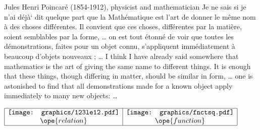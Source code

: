 \qboxnqt
  {
    Jules Henri Poincar\'e (1854-1912), physicist and mathematician
    \footnotemark
  }
  {Je ne sais si je n'ai d\'ej\`a` dit quelque part que la Math\'ematique est 
  l'art de donner le m\^eme nom \`a des choses diff\'erentes. 
  Il convient que ces choses, diff\'erentes par la mati\`ere, 
  soient semblables par la forme, 
  \ldots
  on est tout \'etonn\'e 
  de voir que toutes les d\'emonstrations, faites pour un objet connu, 
  s'appliquent imm\'ediatement \`a beaucoup d'objets nouveaux ; 
  \ldots
  }
  {I think I have already said somewhere that mathematics is the art
   of giving the same name to different things. 
   It is enough that these things, though differing in matter, 
   should be similar in form, 
   \ldots
   one is astonished to find that all
   demonstrations made for a known object apply immediately to many new objects:
   \ldots
   }




$\begin{array}{|c|c|}
   \hline
   \texttt{[image: graphics/123le12.pdf]}
  &\texttt{[image: graphics/fnctsq.pdf]}
  \\\ope{relation}&\ope{function}
  \\\hline
\end{array}$




